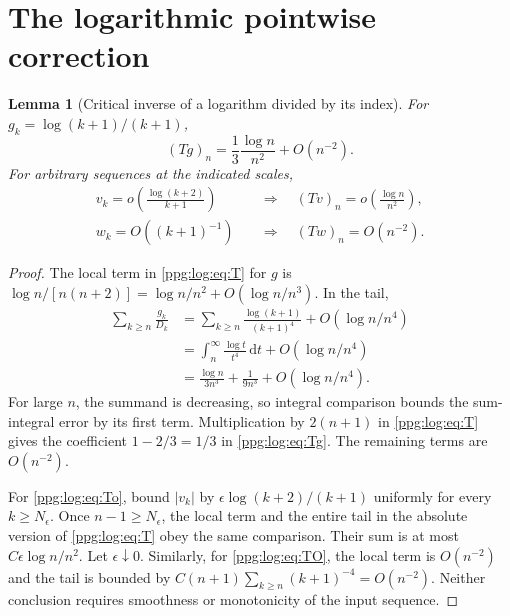 \documentclass[11pt,letterpaper]{article}
\newtheorem{lemma}[theorem]{Lemma}
\theoremstyle{remark}\newtheorem{remark}[theorem]{Remark}
\numberwithin{equation}{section}
\newcommand{\dd}{\mathrm d}
\begin{document}
\section{The logarithmic pointwise correction}\label{ppg:log:sec:second}
\begin{lemma}[Critical inverse of a logarithm divided by its index]\label{ppg:log:lem:Tg}
For $g_k=\log(k+1)/(k+1)$,
\begin{equation}\label{ppg:log:eq:Tg}
 (Tg)_n=\frac13\frac{\log n}{n^2}+O(n^{-2}).
\end{equation}
For arbitrary sequences at the indicated scales,
\begin{align}
 v_k=o\!\left(\frac{\log(k+2)}{k+1}\right)
 &\quad\Longrightarrow\quad (Tv)_n=o\!\left(\frac{\log n}{n^2}\right),\label{ppg:log:eq:To}\\
 w_k=O((k+1)^{-1})
 &\quad\Longrightarrow\quad (Tw)_n=O(n^{-2}).\label{ppg:log:eq:TO}
\end{align}
\end{lemma}
\begin{proof}
The local term in \eqref{ppg:log:eq:T} for $g$ is $\log n/[n(n+2)]=\log n/n^2+O(\log n/n^3)$. In the tail,
\begin{align*}
 \sum_{k\ge n}\frac{g_k}{D_k}
 &=\sum_{k\ge n}\frac{\log(k+1)}{(k+1)^4}
                    +O(\log n/n^4)\\
 &=\int_n^\infty\frac{\log t}{t^4}\,\dd t+O(\log n/n^4)\\
 &=\frac{\log n}{3n^3}+\frac1{9n^3}+O(\log n/n^4).
\end{align*}
For large $n$, the summand is decreasing, so integral comparison bounds the sum-integral error by its first term. Multiplication by $2(n+1)$ in \eqref{ppg:log:eq:T} gives the coefficient $1-2/3=1/3$ in \eqref{ppg:log:eq:Tg}. The remaining terms are $O(n^{-2})$.

For \eqref{ppg:log:eq:To}, bound $|v_k|$ by $\epsilon\log(k+2)/(k+1)$ uniformly for every $k\ge N_\epsilon$. Once $n-1\ge N_\epsilon$, the local term and the entire tail in the absolute version of \eqref{ppg:log:eq:T} obey the same comparison. Their sum is at most $C\epsilon\log n/n^2$. Let $\epsilon\downarrow0$. Similarly, for \eqref{ppg:log:eq:TO}, the local term is $O(n^{-2})$ and the tail is bounded by $C(n+1)\sum_{k\ge n}(k+1)^{-4}=O(n^{-2})$. Neither conclusion requires smoothness or monotonicity of the input sequence.
\end{proof}
\end{document}
